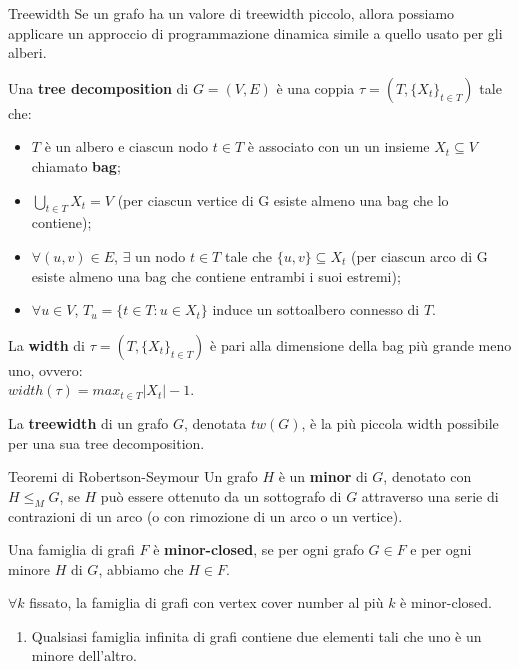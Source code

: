 \documentclass[10pt,a4paper]{article}
\begin{document}
\begin{multicols}{3}
\begin{textbox}{Treewidth}
Se un grafo ha un valore di treewidth
piccolo, allora possiamo applicare un approccio di
programmazione dinamica simile a quello usato per gli alberi.

Una \textbf{tree decomposition} di \(G=(V,E)\) è una coppia \(\tau=(T, \{X_t\}_{t\in T})\) tale che:
\begin{itemize}[leftmargin=*]
    \item \(T\) è un albero e ciascun nodo \(t\in T\) è associato con un un insieme \(X_t \subseteq V\) chiamato \textbf{bag};
    \item \(\bigcup_{t\in T}X_t=V\) (per ciascun vertice di G esiste almeno una bag che lo contiene);
    \item \(\forall (u,v) \in E\), \(\exists\) un nodo \(t\in T\) tale che \(\{u,v\} \subseteq X_t\)
    (per ciascun arco di G esiste almeno una bag che contiene entrambi i suoi estremi);
    \item \(\forall u \in V\), \(T_u = \{t\in T: u\in X_t\}\) induce un sottoalbero connesso di \(T\).
\end{itemize}

La \textbf{width} di \(\tau=(T, \{X_t\}_{t\in T})\) è pari alla dimensione della bag più
grande meno uno, ovvero:\\\(width(\tau) = max_{t\in T} |X_t|-1\).

La \textbf{treewidth} di un grafo \(G\), denotata \(tw(G)\), è la più piccola width
possibile per una sua tree decomposition.
\end{textbox}



\begin{textbox}{Teoremi di Robertson-Seymour}
Un grafo \(H\) è un \textbf{minor} di \(G\), denotato con \(H \leq_M G\), se \(H\)
può essere ottenuto da un sottografo di \(G\) attraverso una serie di
contrazioni di un arco (o con rimozione di un arco o un vertice).

Una famiglia di grafi \(F\) è \textbf{minor-closed}, se per ogni grafo \(G \in F\) e
per ogni minore \(H\) di \(G\), abbiamo che \(H \in F\).

\(\forall k\) fissato, la famiglia di grafi con vertex cover
number al più \(k\) è minor-closed.

\begin{enumerate}[leftmargin=*]
    \item Qualsiasi famiglia infinita di grafi contiene due elementi tali che uno è un minore dell’altro.
    

\end{enumerate}
\end{textbox}
\end{multicols}
\end{document}
